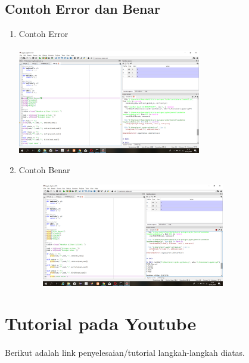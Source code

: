 \documentclass{article}
\begin{document}
\subsection{Contoh Error dan Benar}
\begin{enumerate}
    \item Contoh Error
    \paragraph{}
        \centerline{\includegraphics[width=8cm]{image/error.png}}
    \item Contoh Benar
    \begin{figure}[h]
            \centerline{\includegraphics[width=8cm]{image/contohbenar.png}}
        \end{figure}
\end{enumerate}

\section{Tutorial pada Youtube}
\paragraph{}
    Berikut adalah link penyelesaian/tutorial langkah-langkah diatas.\\
    \usepackage{https://www.youtube.com/playlist?list=PLJfuySxgkmIt_gSwx9jFQQzfutLV8_Kci}
    
\end{document}
